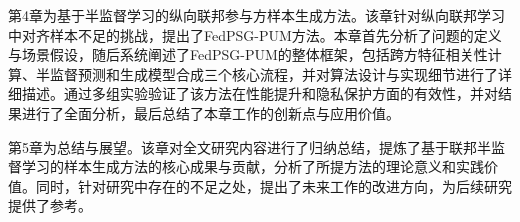 第4章为基于半监督学习的纵向联邦参与方样本生成方法。该章针对纵向联邦学习中对齐样本不足的挑战，提出了FedPSG-PUM方法。本章首先分析了问题的定义与场景假设，随后系统阐述了FedPSG-PUM的整体框架，包括跨方特征相关性计算、半监督预测和生成模型合成三个核心流程，并对算法设计与实现细节进行了详细描述。通过多组实验验证了该方法在性能提升和隐私保护方面的有效性，并对结果进行了全面分析，最后总结了本章工作的创新点与应用价值。

第5章为总结与展望。该章对全文研究内容进行了归纳总结，提炼了基于联邦半监督学习的样本生成方法的核心成果与贡献，分析了所提方法的理论意义和实践价值。同时，针对研究中存在的不足之处，提出了未来工作的改进方向，为后续研究提供了参考。
\clearpage


